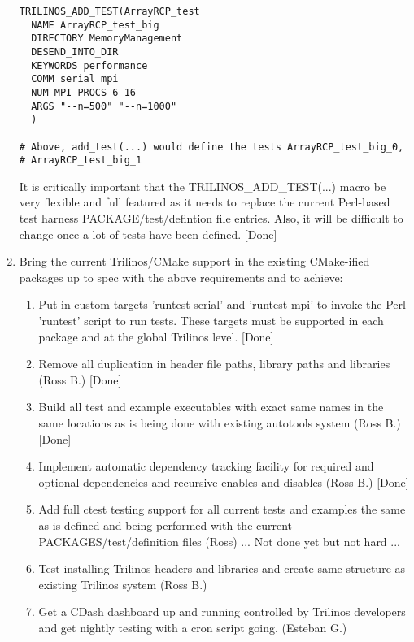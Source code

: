 \documentclass[pdf,ps2pdf,11pt]{SANDreport}
\begin{document}
\begin{enumerate}
\begin{verbatim}
TRILINOS_ADD_TEST(ArrayRCP_test
  NAME ArrayRCP_test_big
  DIRECTORY MemoryManagement
  DESEND_INTO_DIR
  KEYWORDS performance
  COMM serial mpi
  NUM_MPI_PROCS 6-16
  ARGS "--n=500" "--n=1000"
  )

# Above, add_test(...) would define the tests ArrayRCP_test_big_0,
# ArrayRCP_test_big_1

\end{verbatim}

It is critically important that the TRILINOS\_ADD\_TEST(...) macro be
very flexible and full featured as it needs to replace the current
Perl-based test harness PACKAGE/test/defintion file entries.  Also, it
will be difficult to change once a lot of tests have been
defined. [Done]

{}\item Bring the current Trilinos/CMake support in the existing
CMake-ified packages up to spec with the above requirements and to
achieve:

  \begin{enumerate}

  {}\item Put in custom targets 'runtest-serial' and 'runtest-mpi' to
  invoke the Perl 'runtest' script to run tests.  These targets must
  be supported in each package and at the global Trilinos
  level. [Done]

  {}\item Remove all duplication in header file paths, library paths
  and libraries (Ross B.) [Done]

  {}\item Build all test and example executables with exact same names
  in the same locations as is being done with existing autotools
  system (Ross B.) [Done]

  {}\item Implement automatic dependency tracking facility for
  required and optional dependencies and recursive enables and
  disables (Ross B.) [Done]

  {}\item Add full ctest testing support for all current tests and
  examples the same as is defined and being performed with the current
  PACKAGES/test/definition files (Ross) ... Not done yet but not hard
  ...

  {}\item Test installing Trilinos headers and libraries and create
  same structure as existing Trilinos system (Ross B.)

  {}\item Get a CDash dashboard up and running controlled by Trilinos
  developers and get nightly testing with a cron script
  going. (Esteban G.)


\end{enumerate}
\end{enumerate}
\end{document}
